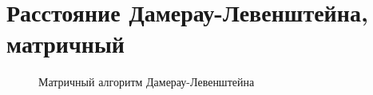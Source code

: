 \documentclass[12pt,a4paper]{report}
\begin{document}
\section*{Расстояние Дамерау-Левенштейна, матричный}
\begin{figure}[ht]
	\caption{Матричный алгоритм Дамерау-Левенштейна}
\end{figure}

\newpage
\end{document}
